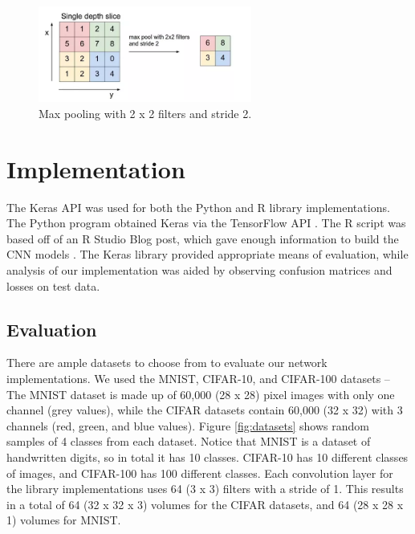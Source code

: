 \documentclass[letterpaper]{article} %
\begin{document}
\begin{figure}[htbp]
\centerline{\includegraphics[width=7cm]{max_pooling.png}}
\caption{Max pooling with 2 x 2 filters and stride 2.}
\label{fig:max_pooling}
\end{figure}

\section{Implementation}
The Keras API was used for both the Python and R library implementations.
The Python program obtained Keras via the TensorFlow API \cite{python}.
The R script was based off of an R Studio Blog post,
which gave enough information to build the CNN models \cite{r}.
The Keras library provided appropriate means of evaluation,
while analysis of our implementation was aided by observing confusion matrices
and losses on test data.

\subsection{Evaluation}
There are ample datasets to choose from to evaluate our network implementations.
We used the MNIST, CIFAR-10, and CIFAR-100 datasets --
The MNIST dataset is made up of 60,000 (28 x 28) pixel images with only one channel (grey values),
while the CIFAR datasets contain 60,000 (32 x 32) with 3 channels (red, green,
and blue values).
Figure \ref{fig:datasets} shows random samples of 4 classes from each dataset.
Notice that MNIST is a dataset of handwritten digits, so in total it has 10 classes.
CIFAR-10 has 10 different classes of images, and CIFAR-100 has 100 different classes.
Each convolution layer for the library implementations uses 64 (3 x 3) filters with a stride of 1.
This results in a total of 64 (32 x 32 x 3) volumes for the CIFAR datasets,
and 64 (28 x 28 x 1) volumes for MNIST.
\end{document}
